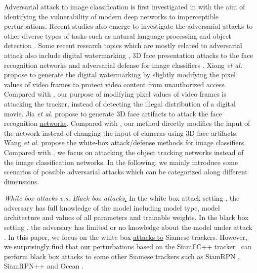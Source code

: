\documentclass[journal]{IEEEtran}
\begin{document}
Adversarial attack \cite{9169672} to image classification is first investigated in \cite{intriguing} with the aim of identifying the vulnerability of modern deep networks to imperceptible perturbations. Recent studies also emerge to investigate the adversarial attacks to other diverse types of tasks such as natural language processing \cite{generating,zhang2020adversarial,morris2020textattack,jin2020bert} and object detection \cite{wei2019transferable}. Some recent research topics which are mostly related to adversarial attack also include digital watermarking \cite{9343885}, 3D face presentation attacks to the face recognition networks \cite{9294085} and adversarial defense for image classifiers \cite{9169672}. Xiong \textit{et al.} \cite{9343885} propose to generate the digital watermarking by slightly modifying the pixel values of video frames to protect video content from unauthorized access. Compared with \cite{9343885}, our purpose of modifying pixel values of video frames is attacking the tracker, instead of detecting the illegal distribution of a digital movie. Jia \textit{et al.} \cite{9294085} propose to generate 3D face artifacts to attack the face recognition \uline{networks}. Compared with \cite{9294085}, our method directly modifies the input of the network instead of changing the input of cameras using 3D face artifacts. Wang \textit{et al.} \cite{9169672} propose the white-box attack/defense methods for image classifiers. Compared with \cite{9169672}, we focus on attacking the object tracking networks instead of the image classification networks. In the following, we mainly introduce some scenarios of possible adversarial attacks which can be categorized along different dimensions.

\textit{White box attacks v.s. Black box attacks\uline{.}} In the white box attack setting \cite{meng2019white}, the adversary has full knowledge of the model including model type, model architecture and values of all parameters and trainable weights. In the black box setting \cite{cheng2018query,li2019nattack,papernot2017practical,li2020projection}, the adversary has limited or no knowledge about the model under attack \cite{kurakin2018adversarial}. In this paper, we focus on the white box \uline{attacks to} Siamese trackers. However, we surprisingly find that \uline{our} perturbations based on the SiamFC++ tracker~\cite{SiamFC++} can perform black box attacks to some other Siamese trackers such as SiamRPN \cite{SiamRPN}, SiamRPN++ \cite{SiamRPN++} and Ocean \cite{zhang2020ocean}.
\end{document}
